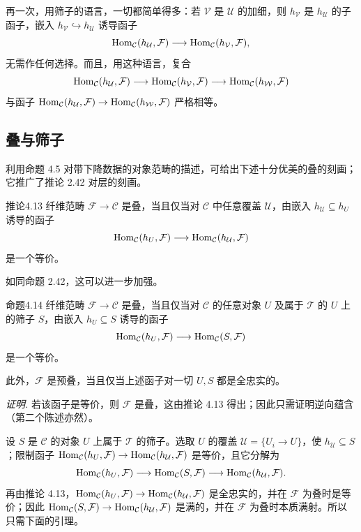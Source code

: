 再一次，用筛子的语言，一切都简单得多：若 $\mathcal V$ 是 $\mathcal U$ 的加细，则 $h_{\mathcal V}$ 是 $h_{\mathcal U}$ 的子函子，嵌入 $h_{\mathcal V}\hookrightarrow h_{\mathcal U}$ 诱导函子
\[
 \operatorname{Hom}_{\mathcal C}(h_{\mathcal U},\mathcal F)\longrightarrow\operatorname{Hom}_{\mathcal C}(h_{\mathcal V},\mathcal F),
\]
无需作任何选择。而且，用这种语言，复合
\[
 \operatorname{Hom}_{\mathcal C}(h_{\mathcal U},\mathcal F)\longrightarrow
 \operatorname{Hom}_{\mathcal C}(h_{\mathcal V},\mathcal F)\longrightarrow
 \operatorname{Hom}_{\mathcal C}(h_{\mathcal W},\mathcal F)
\]
与函子 $\operatorname{Hom}_{\mathcal C}(h_{\mathcal U},\mathcal F)\to\operatorname{Hom}_{\mathcal C}(h_{\mathcal W},\mathcal F)$ 严格相等。

\subsection{叠与筛子}
利用命题 4.5 对带下降数据的对象范畴的描述，可给出下述十分优美的叠的刻画；它推广了推论 2.42 对层的刻画。

\begin{origstatement}{推论}{4.13}\label{ch04:cor413}
纤维范畴 $\mathcal F\to\mathcal C$ 是叠，当且仅当对 $\mathcal C$ 中任意覆盖 $\mathcal U$，由嵌入 $h_{\mathcal U}\subseteq h_U$ 诱导的函子
\[
 \operatorname{Hom}_{\mathcal C}(h_U,\mathcal F)\longrightarrow\operatorname{Hom}_{\mathcal C}(h_{\mathcal U},\mathcal F)
\]
是一个等价。
\end{origstatement}

如同命题 2.42，这可以进一步加强。

\begin{origstatement}{命题}{4.14}\label{ch04:prop414}
纤维范畴 $\mathcal F\to\mathcal C$ 是叠，当且仅当对 $\mathcal C$ 的任意对象 $U$ 及属于 $\mathcal T$ 的 $U$ 上的筛子 $S$，由嵌入 $h_U\subseteq S$ 诱导的函子
\[
 \operatorname{Hom}_{\mathcal C}(h_U,\mathcal F)\longrightarrow\operatorname{Hom}_{\mathcal C}(S,\mathcal F)
\]
是一个等价。

此外，$\mathcal F$ 是预叠，当且仅当上述函子对一切 $U,S$ 都是全忠实的。
\end{origstatement}
\noindent\textit{证明.}
若该函子是等价，则 $\mathcal F$ 是叠，这由推论 4.13 得出；因此只需证明逆向蕴含（第二个陈述亦然）。

设 $S$ 是 $\mathcal C$ 的对象 $U$ 上属于 $\mathcal T$ 的筛子。选取 $U$ 的覆盖 $\mathcal U=\{U_i\to U\}$，使 $h_{\mathcal U}\subseteq S$；限制函子 $\operatorname{Hom}_{\mathcal C}(h_U,\mathcal F)\to\operatorname{Hom}_{\mathcal C}(h_{\mathcal U},\mathcal F)$ 是等价，且它分解为
\[
 \operatorname{Hom}_{\mathcal C}(h_U,\mathcal F)\longrightarrow\operatorname{Hom}_{\mathcal C}(S,\mathcal F)
 \longrightarrow\operatorname{Hom}_{\mathcal C}(h_{\mathcal U},\mathcal F).
\]
再由推论 4.13，$\operatorname{Hom}_{\mathcal C}(h_U,\mathcal F)\to\operatorname{Hom}_{\mathcal C}(h_{\mathcal U},\mathcal F)$ 是全忠实的，并在 $\mathcal F$ 为叠时是等价；因此 $\operatorname{Hom}_{\mathcal C}(S,\mathcal F)\to\operatorname{Hom}_{\mathcal C}(h_{\mathcal U},\mathcal F)$ 是满的，并在 $\mathcal F$ 为叠时本质满射。所以只需下面的引理。

